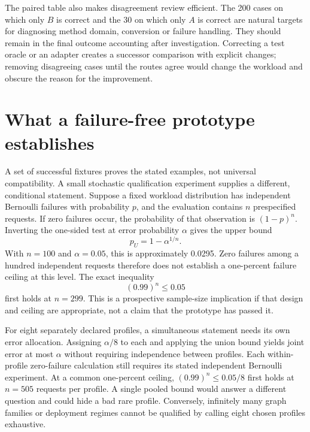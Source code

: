 The paired table also makes disagreement review efficient. The 200 cases on
which only \(B\) is correct and the 30 on which only \(A\) is correct are
natural targets for diagnosing method domain, conversion or failure handling.
They should remain in the final outcome accounting after investigation.
Correcting a test oracle or an adapter creates a successor comparison with
explicit changes; removing disagreeing cases until the routes agree would
change the workload and obscure the reason for the improvement.

\section{What a failure-free prototype establishes}

A set of successful fixtures proves the stated examples, not universal
compatibility. A small stochastic qualification experiment supplies a
different, conditional statement. Suppose a fixed workload distribution has
independent Bernoulli failures with probability \(p\), and the evaluation
contains \(n\) prespecified requests. If zero failures occur, the probability
of that observation is \((1-p)^n\). Inverting the one-sided test at error
probability \(\alpha\) gives the upper bound
\[
 p_U=1-\alpha^{1/n}.
\]
With \(n=100\) and \(\alpha=0.05\), this is approximately 0.0295. Zero failures
among a hundred independent requests therefore does not establish a one-percent
failure ceiling at this level. The exact inequality
\[
 (0.99)^n\leq0.05
\]
first holds at \(n=299\). This is a prospective sample-size implication if
that design and ceiling are appropriate, not a claim that the prototype has
passed it.
\citep{exec16_s10_exact}

For eight separately declared profiles, a simultaneous statement needs its
own error allocation. Assigning \(\alpha/8\) to each and applying the union
bound yields joint error at most \(\alpha\) without requiring independence
between profiles. Each within-profile zero-failure calculation still requires
its stated independent Bernoulli experiment. At a common one-percent ceiling,
\((0.99)^n\leq0.05/8\) first holds at \(n=505\) requests per profile. A single
pooled bound would answer a different question and could hide a bad rare
profile. Conversely, infinitely many graph families or deployment regimes
cannot be qualified by calling eight chosen profiles exhaustive.
\citep{exec16_s10_exact}

